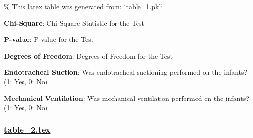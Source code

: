 \documentclass[11pt]{article}
\begin{document}
\begin{codeoutput}
\% This latex table was generated from: `table\_1.pkl`
\begin{table}[h]
\caption{Test of association between policy change and rates of Endotracheal Suction and Mechanical Ventilation, considering confounding factors}
\label{table:tests}
\begin{threeparttable}
\renewcommand{\TPTminimum}{\linewidth}
\begin{tablenotes}
\footnotesize
\item \textbf{Chi-Square}: Chi-Square Statistic for the Test
\item \textbf{P-value}: P-value for the Test
\item \textbf{Degrees of Freedom}: Degrees of Freedom for the Test
\item \textbf{Endotracheal Suction}: Was endotracheal suctioning performed on the infants? (1: Yes, 0: No)
\item \textbf{Mechanical Ventilation}: Was mechanical ventilation performed on the infants? (1: Yes, 0: No)
\end{tablenotes}
\end{threeparttable}
\end{table}
\end{codeoutput}

\subsubsection*{\hyperlink{code-LaTeX Table Design-table-2-tex}{table\_2.tex}}
\end{document}
